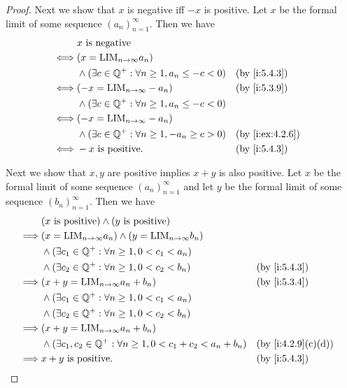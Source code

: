 \begin{proof}
  Next we show that \(x\) is negative iff \(-x\) is positive.
  Let \(x\) be the formal limit of some sequence \((a_n)_{n = 1}^{\infty}\).
  Then we have
  \begin{align*}
         & x \text{ is negative}                                                               \\
    \iff & (x = \text{LIM}_{n \to \infty} a_n)                                                 \\
         & \land (\exists c \in \Q^+ : \forall n \geq 1, a_n \leq -c < 0) &  & \by{i:5.4.3}    \\
    \iff & (-x = \text{LIM}_{n \to \infty} -a_n)                          &  & \by{i:5.3.9}    \\
         & \land (\exists c \in \Q^+ : \forall n \geq 1, a_n \leq -c < 0)                      \\
    \iff & (-x = \text{LIM}_{n \to \infty} -a_n)                                               \\
         & \land (\exists c \in \Q^+ : \forall n \geq 1, -a_n \geq c > 0) &  & \by{i:ex:4.2.6} \\
    \iff & -x \text{ is positive}.                                        &  & \by{i:5.4.3}
  \end{align*}

  Next we show that \(x, y\) are positive implies \(x + y\) is also positive.
  Let \(x\) be the formal limit of some sequence \((a_n)_{n = 1}^{\infty}\) and let \(y\) be the formal limit of some sequence \((b_n)_{n = 1}^{\infty}\).
  Then we have
  \begin{align*}
             & (x \text{ is positive}) \land (y \text{ is positive})                                                  \\
    \implies & (x = \text{LIM}_{n \to \infty} a_n) \land (y = \text{LIM}_{n \to \infty} b_n)                          \\
             & \land (\exists c_1 \in \Q^+ : \forall n \geq 1, 0 < c_1 < a_n)                                         \\
             & \land (\exists c_2 \in \Q^+ : \forall n \geq 1, 0 < c_2 < b_n)                  &  & \by{i:5.4.3}      \\
    \implies & (x + y = \text{LIM}_{n \to \infty} a_n + b_n)                                   &  & \by{i:5.3.4}      \\
             & \land (\exists c_1 \in \Q^+ : \forall n \geq 1, 0 < c_1 < a_n)                                         \\
             & \land (\exists c_2 \in \Q^+ : \forall n \geq 1, 0 < c_2 < b_n)                                         \\
    \implies & (x + y = \text{LIM}_{n \to \infty} a_n + b_n)                                                          \\
             & \land (\exists c_1, c_2 \in \Q^+ : \forall n \geq 1, 0 < c_1 + c_2 < a_n + b_n) &  & \by{i:4.2.9}[c,d] \\
    \implies & x + y \text{ is positive}.                                                      &  & \by{i:5.4.3}
  \end{align*}


\end{proof}
